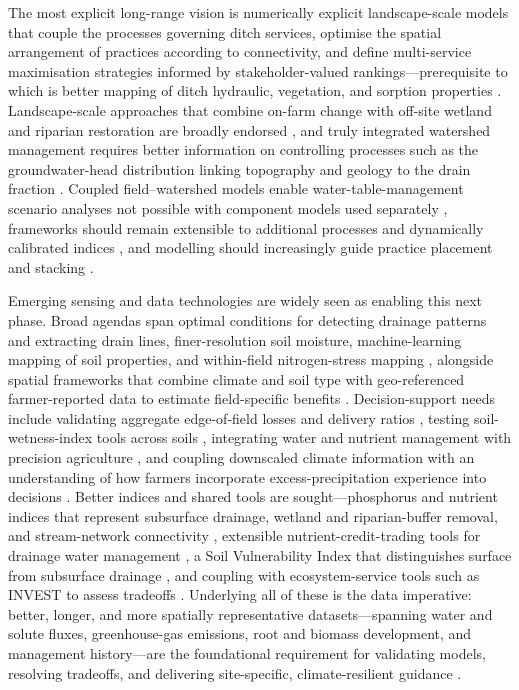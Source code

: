 The most explicit long-range vision is numerically explicit landscape-scale
models that couple the processes governing ditch services, optimise the spatial
arrangement of practices according to connectivity, and define multi-service
maximisation strategies informed by stakeholder-valued rankings---prerequisite
to which is better mapping of ditch hydraulic, vegetation, and sorption
properties \parencite{Dollinger2015,Herzon2008}. Landscape-scale approaches that
combine on-farm change with off-site wetland and riparian restoration are
broadly endorsed \parencite{Blann2009,Goeller2019}, and truly integrated
watershed management requires better information on controlling processes such
as the groundwater-head distribution linking topography and geology to the drain
fraction \parencite{Mahmood2023}. Coupled field--watershed models enable
water-table-management scenario analyses not possible with component models used
separately \parencite{Dayyani2010}, frameworks should remain extensible to
additional processes and dynamically calibrated indices
\parencite{Basu2010,Tao2025,Verma2014}, and modelling should increasingly guide
practice placement and stacking
\parencite{Kröger2013,Tomer2015,Lemke2011,McDowell2021,King2022,Roley2016}.

Emerging sensing and data technologies are widely seen as enabling this next
phase. Broad agendas span optimal conditions for detecting drainage patterns and
extracting drain lines, finer-resolution soil moisture, machine-learning mapping
of soil properties, and within-field nitrogen-stress mapping
\parencite{Khanal2020}, alongside spatial frameworks that combine climate and
soil type with geo-referenced farmer-reported data to estimate field-specific
benefits \parencite{Cassman2025}. Decision-support needs include validating
aggregate edge-of-field losses and delivery ratios \parencite{Reid2018},
testing soil-wetness-index tools across soils \parencite{Julien2023}, integrating
water and nutrient management with precision agriculture \parencite{Jung2024},
and coupling downscaled climate information with an understanding of how farmers
incorporate excess-precipitation experience into decisions \parencite{Morton2015}.
Better indices and shared tools are sought---phosphorus and nutrient indices that
represent subsurface drainage, wetland and riparian-buffer removal, and
stream-network connectivity \parencite{Buczko2007,Pärn2012}, extensible
nutrient-credit-trading tools for drainage water management \parencite{Negm2016},
a Soil Vulnerability Index that distinguishes surface from subsurface drainage
\parencite{Baffaut2020}, and coupling with ecosystem-service tools such as INVEST
to assess tradeoffs \parencite{McLellan2015}. Underlying all of these is the data
imperative: better, longer, and more spatially representative datasets---spanning
water and solute fluxes, greenhouse-gas emissions, root and biomass development,
and management history---are the foundational requirement for validating models,
resolving tradeoffs, and delivering site-specific, climate-resilient guidance
\parencite{Ma2025,SKAGGS1994,Deng2011}.